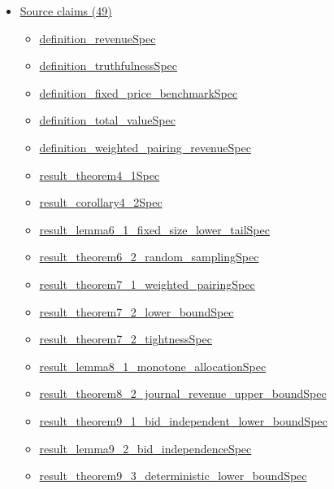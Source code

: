 \documentclass[10pt]{article}
\begin{document}
\begin{itemize}[leftmargin=1.2em]
\begin{itemize}[leftmargin=1.2em]
\item \hyperlink{library-prerequisite-7fec9dedef722fc8}{EconCSLib.pmfProb}
\item \hyperlink{library-prerequisite-00a2add8d3a6edfc}{EconCSLib.uniformPMF}
\end{itemize}
\item \hyperlink{source-section-f10b5f68e4acf3dc}{Source claims (49)}
\begin{itemize}[leftmargin=1.2em]
\item \hyperlink{source-claim-92a5f1831a1a154c}{definition\_revenueSpec}
\item \hyperlink{source-claim-fcc1c57101887a67}{definition\_truthfulnessSpec}
\item \hyperlink{source-claim-12f62bc2b16a034f}{definition\_fixed\_price\_benchmarkSpec}
\item \hyperlink{source-claim-c629f252e7aba094}{definition\_total\_valueSpec}
\item \hyperlink{source-claim-11a904f37ac25550}{definition\_weighted\_pairing\_revenueSpec}
\item \hyperlink{source-claim-2bea065aff29fbec}{result\_theorem4\_1Spec}
\item \hyperlink{source-claim-c584c5cb21438e15}{result\_corollary4\_2Spec}
\item \hyperlink{source-claim-de03b129c03015d1}{result\_lemma6\_1\_fixed\_size\_lower\_tailSpec}
\item \hyperlink{source-claim-dbcf1d32b28d9965}{result\_theorem6\_2\_random\_samplingSpec}
\item \hyperlink{source-claim-f07b3322ac4a8773}{result\_theorem7\_1\_weighted\_pairingSpec}
\item \hyperlink{source-claim-d2203fdcdcb5c29a}{result\_theorem7\_2\_lower\_boundSpec}
\item \hyperlink{source-claim-9c375a1b7af827ba}{result\_theorem7\_2\_tightnessSpec}
\item \hyperlink{source-claim-16eee1e38ed670e7}{result\_lemma8\_1\_monotone\_allocationSpec}
\item \hyperlink{source-claim-e7742b37ea94b834}{result\_theorem8\_2\_journal\_revenue\_upper\_boundSpec}
\item \hyperlink{source-claim-2aeebcaf889368d8}{result\_theorem9\_1\_bid\_independent\_lower\_boundSpec}
\item \hyperlink{source-claim-60df12d3b02570ba}{result\_lemma9\_2\_bid\_independenceSpec}
\item \hyperlink{source-claim-6ef8d3c17f2b5df3}{result\_theorem9\_3\_deterministic\_lower\_boundSpec}

\end{itemize}
\end{itemize}
\end{document}
